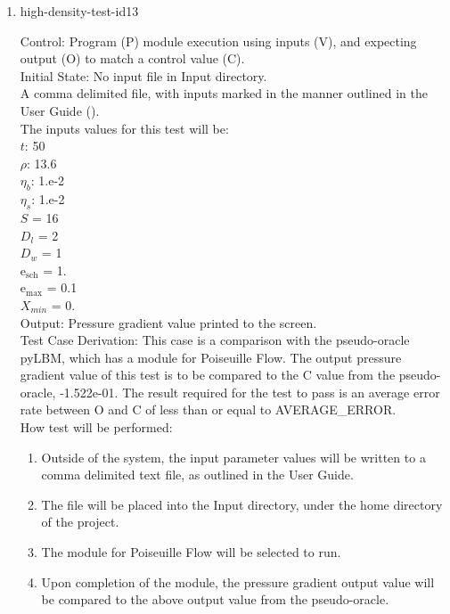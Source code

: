 \documentclass[12pt, titlepage]{article}
\begin{document}
\begin{enumerate}
\item{high-density-test-id13\\}

Control: Program (P) module execution using inputs (V), and expecting output (O) to match a control value (C).\\
					
Initial State: No input file in Input directory.\\
					
A comma delimited file, with inputs marked in the manner outlined in the User Guide (\citet{LBM_UserGuide_PM}).\\The inputs values for this test will be:\\
$t$: 50\\
$\rho$: 13.6\\
$\eta_b$: 1.e-2\\
$\eta_s$: 1.e-2\\
$S$ = 16\\
$D_{l}$ = 2\\
$D_{w}$ = 1\\
$\mathrm{e_{sch}}$ = 1.\\
$\mathrm{e_{max}}$ = 0.1\\
$X_{min}$ = 0.\\

					
Output: Pressure gradient value printed to the screen.  \\

Test Case Derivation: This case is a comparison with the pseudo-oracle pyLBM, which has a module for Poiseuille Flow. The output pressure gradient value of this test is to be compared to the C value from the pseudo-oracle, -1.522e-01. The result required for the test to pass is an average error rate between O and C of less than or equal to AVERAGE\_ERROR.\\

					
How test will be performed: 

\begin{enumerate}
\item Outside of the system, the input parameter values will be written to a comma delimited text file, as outlined in the User Guide.
\item The file will be placed into the Input directory, under the home directory of the project.
\item The module for Poiseuille Flow will be selected to run.
\item Upon completion of the module, the pressure gradient output value will be compared to the above output value from the pseudo-oracle.
\end{enumerate}	


\end{enumerate}
\end{document}
